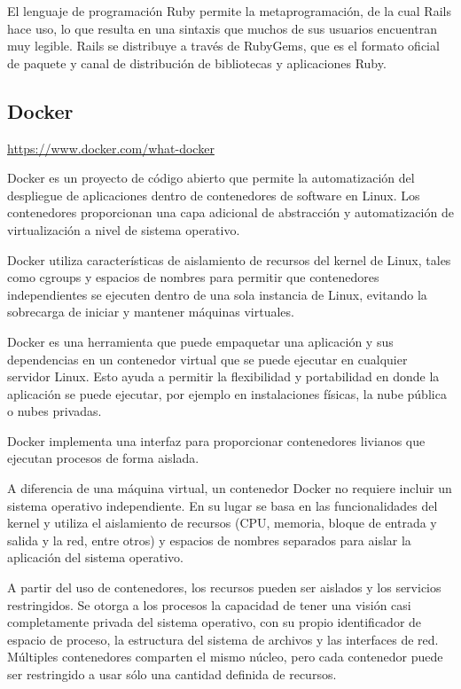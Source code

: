 El lenguaje de programación Ruby permite la metaprogramación, de la cual Rails
hace uso, lo que resulta en una sintaxis que muchos de sus usuarios encuentran
muy legible. Rails se distribuye a través de RubyGems, que es el formato
oficial de paquete y canal de distribución de bibliotecas y aplicaciones Ruby.

\subsection{Docker}
\url{https://www.docker.com/what-docker}

Docker es un proyecto de código abierto que permite la automatización del
despliegue de aplicaciones dentro de contenedores de software en Linux. Los
contenedores proporcionan una capa adicional de abstracción y automatización de
virtualización a nivel de sistema operativo.

Docker utiliza características de aislamiento de recursos del kernel de Linux,
tales como cgroups y espacios de nombres para permitir que contenedores
independientes se ejecuten dentro de una sola instancia de Linux, evitando la
sobrecarga de iniciar y mantener máquinas virtuales.

Docker es una herramienta que puede empaquetar una aplicación y sus
dependencias en un contenedor virtual que se puede ejecutar en cualquier
servidor Linux. Esto ayuda a permitir la flexibilidad y portabilidad en donde
la aplicación se puede ejecutar, por ejemplo en instalaciones físicas, la nube
pública o nubes privadas.

Docker implementa una interfaz para proporcionar contenedores livianos que
ejecutan procesos de forma aislada. 

A diferencia de una máquina virtual, un contenedor Docker no requiere incluir
un sistema operativo independiente. En su lugar se basa en las funcionalidades
del kernel y utiliza el aislamiento de recursos (CPU, memoria, bloque de
entrada y salida y la red, entre otros) y espacios de nombres separados para
aislar la aplicación del sistema operativo.

A partir del uso de contenedores, los recursos pueden ser aislados y los
servicios restringidos. Se otorga a los procesos la capacidad de tener una
visión casi completamente privada del sistema operativo, con su propio
identificador de espacio de proceso, la estructura del sistema de archivos y
las interfaces de red. Múltiples contenedores comparten el mismo núcleo, pero
cada contenedor puede ser restringido a usar sólo una cantidad definida de
recursos.

